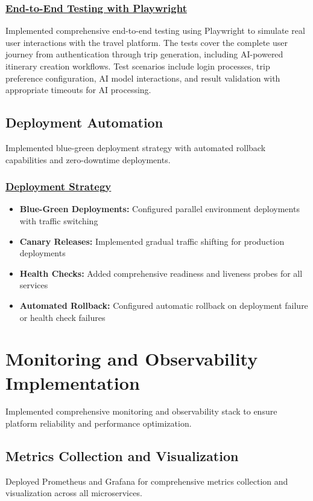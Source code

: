 \subsubsection*{\underline{End-to-End Testing with Playwright}}
Implemented comprehensive end-to-end testing using Playwright to simulate real user interactions with the travel platform. The tests cover the complete user journey from authentication through trip generation, including AI-powered itinerary creation workflows. Test scenarios include login processes, trip preference configuration, AI model interactions, and result validation with appropriate timeouts for AI processing.

\subsection{Deployment Automation}
Implemented blue-green deployment strategy with automated rollback capabilities and zero-downtime deployments.

\subsubsection*{\underline{Deployment Strategy}}
\begin{itemize}
    \item \textbf{Blue-Green Deployments:} Configured parallel environment deployments with traffic switching
    \item \textbf{Canary Releases:} Implemented gradual traffic shifting for production deployments
    \item \textbf{Health Checks:} Added comprehensive readiness and liveness probes for all services
    \item \textbf{Automated Rollback:} Configured automatic rollback on deployment failure or health check failures
\end{itemize}

\section{Monitoring and Observability Implementation}
Implemented comprehensive monitoring and observability stack to ensure platform reliability and performance optimization.

\subsection{Metrics Collection and Visualization}
Deployed Prometheus and Grafana for comprehensive metrics collection and visualization across all microservices.

